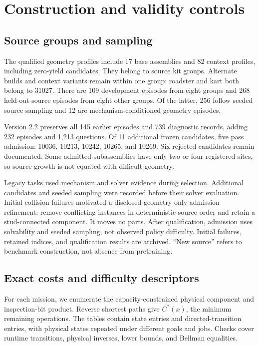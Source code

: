 \documentclass[10pt,twocolumn,letterpaper]{article}
\begin{document}
\section{Construction and validity controls}
\subsection{Source groups and sampling}
The \ProfileCount{} qualified geometry profiles include 17 base
assemblies and 82 context profiles, including zero-yield candidates.
They belong to \SourceCount{} source kit groups. Alternate builds and
context variants remain within one group: roadster and kart both belong
to 31027. There are 109 development episodes from eight groups and
268 held-out-source episodes from eight other groups. Of the latter,
256 follow seeded source sampling and 12 are mechanism-conditioned
geometry episodes.

Version 2.2 preserves all 145 earlier episodes and 739 diagnostic
records, adding 232 episodes and 1,213 questions. Of 11 additional
frozen candidates, five pass admission: 10036, 10213, 10242, 10265,
and 10269. Six rejected candidates remain documented. Some admitted
subassemblies have only two or four registered sites, so source growth
is not equated with difficult geometry.

Legacy tasks used mechanism and solver evidence during selection.
Additional candidates and seeded sampling were recorded before their
solver evaluation. Initial collision failures motivated a disclosed
geometry-only admission refinement: remove conflicting instances in
deterministic source order and retain a stud-connected component.
It moves no parts. After qualification, admission uses solvability
and seeded sampling, not observed policy difficulty. Initial failures,
retained indices, and qualification results are archived. ``New source''
refers to benchmark construction, not absence from pretraining.

\begin{table}[t]
\centering\small
\caption{Fixed operation-length bins: D1 (1--8), D2 (9--16), D3
(17--24), D4 (25+). They are not cognitive-depth levels.}
\resizebox{\columnwidth}{!}{}
\label{tab:tiers}
\end{table}

\subsection{Exact costs and difficulty descriptors}
For each mission, we enumerate the capacity-constrained physical
component and inspection-bit product. Reverse shortest paths give
$C^*(x)$, the minimum remaining operations. The \OracleCount{} tables
contain \ProductCount{} state entries and \EdgeCount{} directed-transition
entries, with physical states repeated under different goals and jobs.
Checks cover runtime transitions, physical inverses, lower bounds, and
Bellman equalities.
\end{document}
